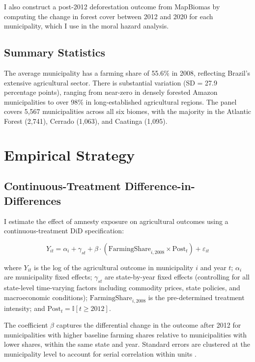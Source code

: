 \documentclass[12pt]{article}
\newcommand{\ind}{\mathbb{I}}
\begin{document}
I also construct a post-2012 deforestation outcome from MapBiomas by computing the change in forest cover between 2012 and 2020 for each municipality, which I use in the moral hazard analysis.

\subsection{Summary Statistics}



The average municipality has a farming share of 55.6\% in 2008, reflecting Brazil's extensive agricultural sector. There is substantial variation (SD = 27.9 percentage points), ranging from near-zero in densely forested Amazon municipalities to over 98\% in long-established agricultural regions. The panel covers 5,567 municipalities across all six biomes, with the majority in the Atlantic Forest (2,741), Cerrado (1,063), and Caatinga (1,095).


\section{Empirical Strategy}

\subsection{Continuous-Treatment Difference-in-Differences}

I estimate the effect of amnesty exposure on agricultural outcomes using a continuous-treatment DiD specification:

\begin{equation}
Y_{it} = \alpha_i + \gamma_{st} + \beta \cdot (\text{FarmingShare}_{i,2008} \times \text{Post}_t) + \varepsilon_{it}
\label{eq:main}
\end{equation}

\noindent where $Y_{it}$ is the log of the agricultural outcome in municipality $i$ and year $t$; $\alpha_i$ are municipality fixed effects; $\gamma_{st}$ are state-by-year fixed effects (controlling for all state-level time-varying factors including commodity prices, state policies, and macroeconomic conditions); $\text{FarmingShare}_{i,2008}$ is the pre-determined treatment intensity; and $\text{Post}_t = \ind[t \geq 2012]$.

The coefficient $\beta$ captures the differential change in the outcome after 2012 for municipalities with higher baseline farming shares relative to municipalities with lower shares, within the same state and year. Standard errors are clustered at the municipality level to account for serial correlation within units \citep{bertrand2004much}.
\end{document}
